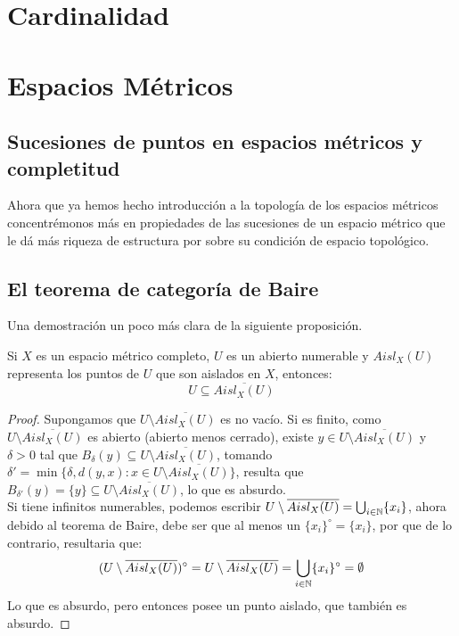 \documentclass[12pt,a4paper]{book}
\begin{document}
\chapter{Cardinalidad}


\newpage

\newpage

\newpage


\chapter{Espacios Métricos}


\newpage

\newpage

\newpage



\section{Sucesiones de puntos en espacios métricos y completitud}
Ahora que ya hemos hecho introducción a la topología de los espacios métricos concentrémonos más en propiedades de las sucesiones de un espacio métrico que le dá más riqueza de estructura por sobre su condición de espacio topológico.

\section{El teorema de categoría de Baire}
Una demostración un poco más clara de la siguiente proposición.
\begin{prop}
Si $X$ es un espacio métrico completo, $U$ es un abierto numerable y $Aisl_X(U)$ representa los puntos de $U$ que son aislados en $X$, entonces:
$$ U \subseteq \overline{Aisl_X(U)}$$
\begin{proof}
Supongamos que $U \setminus \overline{Aisl_X(U)}$ es no vacío. Si es finito, como $U \setminus \overline{Aisl_X(U)}$ es abierto (abierto menos cerrado), existe $y \in U \setminus \overline{Aisl_X(U)}$ y $\delta > 0 $ tal que $B_{\delta}(y)\subseteq U \setminus \overline{Aisl_X(U)}$, tomando $\delta' = \min\{\delta , d(y,x): x \in U \setminus \overline{Aisl_X(U)}\}$, resulta que $B_{\delta'}(y)=\{y\} \subseteq U \setminus \overline{Aisl_X(U)}$, lo que es absurdo. \\
Si tiene infinitos numerables, podemos escribir $U \setminus \overline{Aisl_X(U)} = \bigcup_{i \in \mathbb{N}} \{x_i\}$, ahora debido al teorema de Baire, debe ser que al menos un $\{x_i\}^{\circ} = \{x_i\}$, por que de lo contrario, resultaria que:
$$ (U \setminus \overline{Aisl_X(U)})^{\circ} = U \setminus \overline{Aisl_X(U)} = \bigcup_{i \in \mathbb{N}} \{x_i\}^{\circ} = \emptyset$$
Lo que es absurdo, pero entonces posee un punto aislado, que también es absurdo.
\end{proof}
\end{prop}
\end{document}
